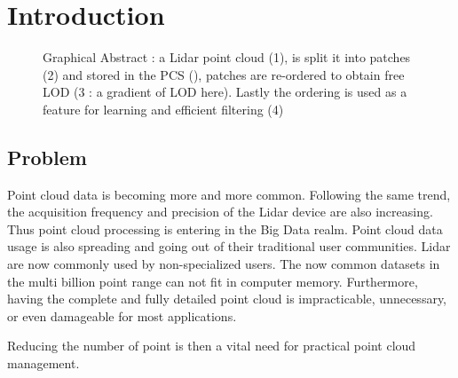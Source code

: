 

\section{Introduction}

\begin{figure}[t!]
	\begin{center}
		\caption{Graphical Abstract : a Lidar point cloud (1), is split it into patches (2) 
		and stored in the PCS (\cite{Cura2015}), patches are re-ordered to obtain free LOD 
		(3 : a gradient of LOD here).
		Lastly the ordering is used as a feature for learning and efficient filtering (4) } 
		\label{lod.fig:banner_image}
	\end{center}
\end{figure} 

	\subsection{Problem}  
		Point cloud data is becoming more and more common. Following the same trend, the acquisition frequency and precision of the Lidar device are also increasing.
		Thus point cloud processing is entering in the Big Data realm.
		Point cloud data usage is also spreading and going out of their traditional user communities. 
		Lidar are now commonly used by non-specialized users. 
		The now common datasets in the multi billion point range can not fit in computer memory. 
		Furthermore, having the complete and fully detailed point cloud is impracticable, unnecessary, or even damageable for most applications.
		
		Reducing the number of point is then a vital need for practical point cloud management.
		
